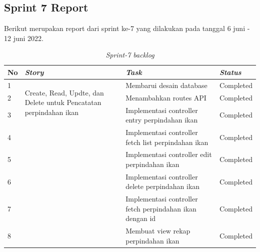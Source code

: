 
\subsection{Sprint 7 Report}
Berikut merupakan report dari sprint ke-7 yang dilakukan pada tanggal 6 juni - 12 juni 2022.

\begin{table}[H]
	\caption{\textit{Sprint-7 backlog}}
	\label{sprint7_backlog}
	\begin{tabular}{@{} |p{0.5cm}|p{5cm}|p{5cm}|p{2cm}| @{}}
		\hline
		\textbf{No} & \textbf{\textit{Story}} & \textbf{\textit{Task}} & \textbf{\textit{Status}} \\
		\hline
		1 & \multirow{3}{5cm}{Create, Read, Updte, dan Delete untuk Pencatatan perpindahan ikan} & Membarui desain database  & Completed\\
		\cline{1-1}\cline{3-4}
		2 & & Menambahkan routes API & Completed\\
		\cline{1-1}\cline{3-4}
		3 & & Implementasi controller entry perpindahan ikan & Completed\\
		\cline{1-1}\cline{3-4}
		4 & & Implementasi controller fetch list perpindahan ikan & Completed\\
		\cline{1-1}\cline{3-4}
		5 & & Implementasi controller edit perpindahan ikan & Completed\\
		\cline{1-1}\cline{3-4}
		6 & & Implementasi controller delete perpindahan ikan & Completed\\
		\cline{1-1}\cline{3-4}
		7 & & Implementasi controller fetch perpindahan ikan dengan id& Completed\\
		\cline{1-1}\cline{3-4}
		8 & & Membuat view rekap perpindahan ikan & Completed\\
		\cline{1-1}\cline{3-4}
		\hline
	\end{tabular}
\end{table}

